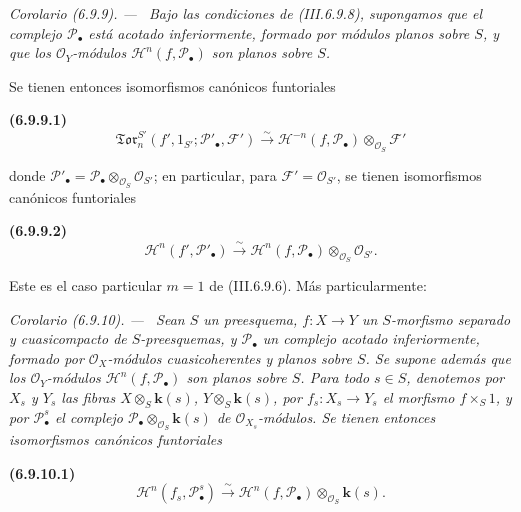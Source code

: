 \documentclass[10pt,oneside]{book}
\newcommand{\sref}[2][]{\textup{(#2)}}
\newcommand{\oldpage}[2][]{\setcounter{footnote}{0}\marginpar{\scriptsize\textbf{#1}~|~#2}\ignorespaces}
\newenvironment{env}[1][]{\par\medskip\noindent\textbf{(#1)}\ }{\par}
\newenvironment{corollary}[1][]{\par\medskip\noindent\itshape Corolario (#1). ---\ }{\par}
\begin{document}
\begin{corollary}[6.9.9]
\label{III.6.9.9}
Bajo las condiciones de \sref{III.6.9.8}, supongamos que el complejo
$\mathscr P_\bullet$ está acotado inferiormente, formado por módulos planos
sobre $S$, y que los $\mathscr O_Y$-módulos
$\mathscr H^n(f,\mathscr P_\bullet)$ son planos sobre $S$.

\oldpage[III]{171}
Se tienen entonces isomorfismos canónicos funtoriales
\begin{env}[6.9.9.1]
\label{III.6.9.9.1}
\[
  \mathfrak{Tor}_n^{S'}
  (f',1_{S'};\mathscr P'_\bullet,\mathscr F')
  \xrightarrow{\sim}
  \mathscr H^{-n}(f,\mathscr P_\bullet)
  \otimes_{\mathscr O_S}\mathscr F'
  \tag{6.9.9.1}\label{III.6.9.9.1.eq}
\]
\end{env}
donde
$\mathscr P'_\bullet=\mathscr P_\bullet\otimes_{\mathscr O_S}
\mathscr O_{S'}$; en particular, para $\mathscr F'=\mathscr O_{S'}$, se
tienen isomorfismos canónicos funtoriales
\begin{env}[6.9.9.2]
\label{III.6.9.9.2}
\[
  \mathscr H^n(f',\mathscr P'_\bullet)
  \xrightarrow{\sim}
  \mathscr H^n(f,\mathscr P_\bullet)
  \otimes_{\mathscr O_S}\mathscr O_{S'}.
  \tag{6.9.9.2}\label{III.6.9.9.2.eq}
\]
\end{env}
\textup{Este es el caso particular $m=1$ de \sref{III.6.9.6}. Más particularmente:}
\end{corollary}

\begin{corollary}[6.9.10]
\label{III.6.9.10}
Sean $S$ un preesquema, $f:X\to Y$ un $S$-morfismo separado y cuasicompacto
de $S$-preesquemas, y $\mathscr P_\bullet$ un complejo acotado
inferiormente, formado por $\mathscr O_X$-módulos cuasicoherentes y planos
sobre $S$. Se supone además que los $\mathscr O_Y$-módulos
$\mathscr H^n(f,\mathscr P_\bullet)$ son planos sobre $S$. Para todo $s\in S$,
denotemos por $X_s$ y $Y_s$ las fibras
$X\otimes_S \boldsymbol k(s)$, $Y\otimes_S \boldsymbol k(s)$,
por $f_s:X_s\to Y_s$ el morfismo $f\times_S1$, y por
$\mathscr P_\bullet^s$ el complejo
$\mathscr P_\bullet\otimes_{\mathscr O_S}\boldsymbol k(s)$ de
$\mathscr O_{X_s}$-módulos. Se tienen entonces isomorfismos canónicos
funtoriales
\begin{env}[6.9.10.1]
\label{III.6.9.10.1}
\[
  \mathscr H^n(f_s,\mathscr P_\bullet^s)
  \xrightarrow{\sim}
  \mathscr H^n(f,\mathscr P_\bullet)\otimes_{\mathscr O_S}\boldsymbol k(s).
  \tag{6.9.10.1}\label{III.6.9.10.1.eq}
\]
\end{env}
\end{corollary}
\end{document}
